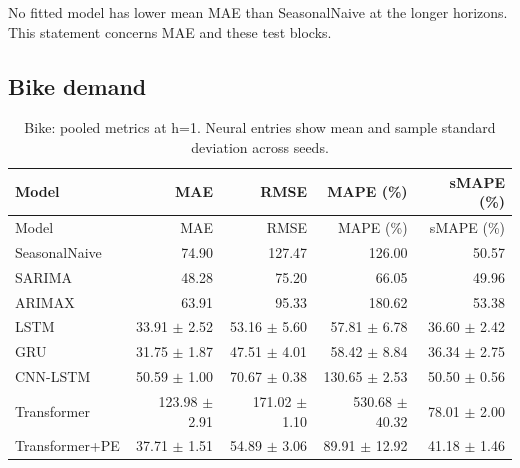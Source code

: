 \documentclass[10pt,a4paper]{article}
\begin{document}
No fitted model has lower mean MAE than SeasonalNaive at the longer horizons. This statement concerns MAE and these test blocks.

\subsection{Bike demand}
\begin{center}\begingroup\footnotesize\setlength{\tabcolsep}{3pt}\begin{longtable}{@{}lrrrr@{}}\caption{Bike: pooled metrics at h=1. Neural entries show mean and sample standard deviation across seeds.}\\\toprule Model & MAE & RMSE & MAPE (\%) & sMAPE (\%)\\\midrule\endfirsthead\toprule Model & MAE & RMSE & MAPE (\%) & sMAPE (\%)\\\midrule\endhead SeasonalNaive & 74.90 & 127.47 & 126.00 & 50.57 \\
SARIMA & 48.28 & 75.20 & 66.05 & 49.96 \\
ARIMAX & 63.91 & 95.33 & 180.62 & 53.38 \\
LSTM & 33.91 $\pm$ 2.52 & 53.16 $\pm$ 5.60 & 57.81 $\pm$ 6.78 & 36.60 $\pm$ 2.42 \\
GRU & 31.75 $\pm$ 1.87 & 47.51 $\pm$ 4.01 & 58.42 $\pm$ 8.84 & 36.34 $\pm$ 2.75 \\
CNN-LSTM & 50.59 $\pm$ 1.00 & 70.67 $\pm$ 0.38 & 130.65 $\pm$ 2.53 & 50.50 $\pm$ 0.56 \\
Transformer & 123.98 $\pm$ 2.91 & 171.02 $\pm$ 1.10 & 530.68 $\pm$ 40.32 & 78.01 $\pm$ 2.00 \\
Transformer+PE & 37.71 $\pm$ 1.51 & 54.89 $\pm$ 3.06 & 89.91 $\pm$ 12.92 & 41.18 $\pm$ 1.46 \\\bottomrule\end{longtable}\endgroup\end{center}
\end{document}
